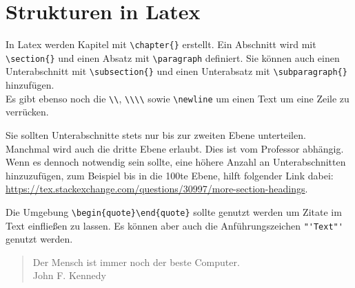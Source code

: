 \chapter{Strukturen in Latex}

In Latex werden Kapitel mit \verb+\chapter{}+ erstellt. Ein Abschnitt wird mit \verb+\section{}+ und einen Absatz mit \verb+\paragraph+ definiert. Sie können auch einen Unterabschnitt mit \verb+\subsection{}+ und einen Unterabsatz mit \verb+\subparagraph{}+ hinzufügen.\\

Es gibt ebenso noch die \verb|\\|, \verb|\\\\| sowie \verb|\newline| um einen Text um eine Zeile zu verrücken. \newline

Sie sollten Unterabschnitte stets nur bis zur zweiten Ebene unterteilen. Manchmal wird auch die dritte Ebene erlaubt. Dies ist vom Professor abhängig. Wenn es dennoch notwendig sein sollte, eine höhere Anzahl an Unterabschnitten hinzuzufügen, zum Beispiel bis in die 100te Ebene, hilft folgender Link dabei: \url{https://tex.stackexchange.com/questions/30997/more-section-headings}.\newline



Die Umgebung \verb|\begin{quote}\end{quote}| sollte genutzt werden um Zitate im Text einfließen zu lassen. Es können aber auch die Anführungszeichen \verb|"'Text"'| genutzt werden.

\begin{quote}
	Der Mensch ist immer noch der beste Computer.\\
	John F. Kennedy \autocite{jfkey}
\end{quote}
